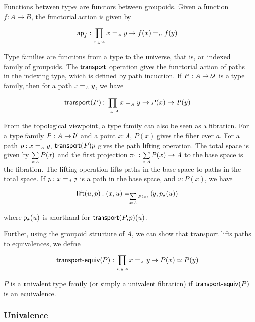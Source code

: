 
Functions between types are functors between groupoids. Given a function $f : A \to B$, the functorial action is given
by

\[
  \term{ap}_{f} : \dfun{x,y:A}{x \id_{A} y \to f(x) \id_{B} f(y)}
\]

Type families are functions from a type to the universe, that is, an indexed family of groupoids. The $\operatorname{\mathsf{transport}}$
operation gives the functorial action of paths in the indexing type, which is defined by path induction. If
$P : A \to \mathcal{U}$ is a type family, then for a path $x \id_{A} y$, we have

\[
  \transport{P} : \dfun{x,y:A}{x \id_{A} y \to P(x) \to P(y)}
\]


From the topological viewpoint, a type family can also be seen as a fibration. For a type family $P : A \to \mathcal{U}$ and a
point $x : A$, $P(x)$ gives the fiber over $a$. For a path $p : x \id_{A} y$, $\operatorname{\mathsf{transport}}({P}){p}$ gives the path lifting
operation. The total space is given by $\dsum{x:A}{P(x)}$ and the first projection ${\pi_1 : \dsum{x:A}{P(x)} \to A}$ to
the base space is the fibration. The lifting operation lifts paths in the base space to paths in the total space. If
$p : x \id_{A} y$ is a path in the base space, and $u : P(x)$, we have

\[
  \term{lift}(u,p) : (x , u) \id_{\dsum{x:A}{P(x)}} (y , \tr{p}{u})
\]

where ${p}_{\star}({u})$ is shorthand for $\operatorname{\mathsf{transport}}({P,p})(u)$.

Further, using the groupoid structure of $A$, we can show that transport lifts paths to equivalences, we define

\[
  \tptEqv{P} : \dfun{x,y:A}{x \id_{A} y \to P(x) \eqv P(y)}
\]


\begin{definition}
  $P$ is a univalent type family (or simply a univalent fibration) if $\operatorname{\mathsf{transport-equiv}}({P})$ is an equivalence.
\end{definition}

\subsubsection{Univalence}

